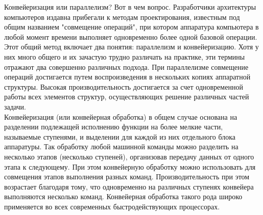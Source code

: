 \documentclass[../main.tex]{subfiles}
\begin{document}
	
	Конвейеризация или параллелизм? Вот в чем вопрос. Разработчики архитектуры компьютеров издавна прибегали к методам проектирования, известным под общим названием "совмещение операций", при котором аппаратура компьютера в любой момент времени выполняет одновременно более одной базовой операции. Этот общий метод включает два понятия: параллелизм и конвейеризацию. Хотя у них много общего и их зачастую трудно различать на практике, эти термины отражают два совершенно различных подхода. При параллелизме совмещение операций достигается путем воспроизведения в нескольких копиях аппаратной структуры. Высокая производительность достигается за счет одновременной работы всех элементов структур, осуществляющих решение различных частей задачи. \\
	
	Конвейеризация (или конвейерная обработка) в общем случае основана на разделении подлежащей исполнению функции на более мелкие части, называемые ступенями, и выделении для каждой из них отдельного блока аппаратуры. Так обработку любой машинной команды можно разделить на несколько этапов (несколько ступеней), организовав передачу данных от одного этапа к следующему. При этом конвейерную обработку можно использовать для совмещения этапов выполнения разных команд. Производительность при этом возрастает благодаря тому, что одновременно на различных ступенях конвейера выполняются несколько команд. Конвейерная обработка такого рода широко применяется во всех современных быстродействующих процессорах. \\
	
\end{document}
